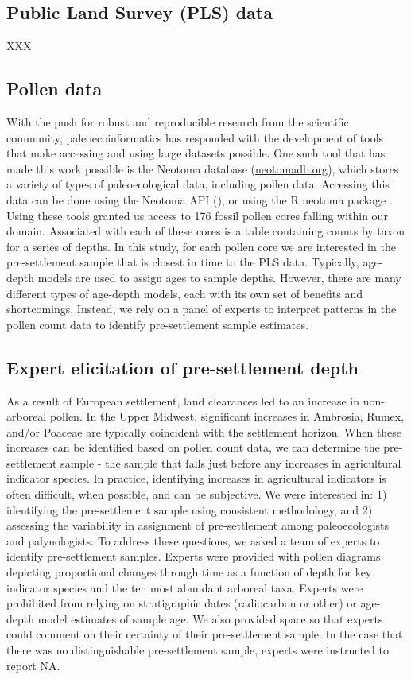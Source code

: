 \documentclass[12pt]{article}
\begin{document}
\subsection{Public Land Survey (PLS) data}
XXX

\subsection{Pollen data}
With the push for robust and reproducible research from the scientific community, paleoecoinformatics has responded with the development of tools that make accessing and using large datasets possible. One such tool that has made this work possible is the Neotoma database (\url{neotomadb.org}), which stores a variety of types of paleoecological data, including pollen data. Accessing this data can be done using the Neotoma API (), or using the R neotoma package \cite{neotoma}. Using these tools granted us access to 176 fossil pollen cores falling within our domain. Associated with each of these cores is a table containing counts by taxon for a series of depths. In this study, for each pollen core we are interested in the pre-settlement sample that is closest in time to the PLS data. Typically, age-depth models are used to assign ages to sample depths. However, there are many different types of age-depth models, each with its own set of benefits and shortcomings. Instead, we rely on a panel of experts to interpret patterns in the pollen count data to identify pre-settlement sample estimates.

\subsection{Expert elicitation of pre-settlement depth}
 As a result of European settlement, land clearances led to an increase in non-arboreal pollen. In the Upper Midwest, significant increases in Ambrosia, Rumex, and/or Poaceae are typically coincident with the settlement horizon. When these increases can be identified based on pollen count data, we can determine the pre-settlement sample - the sample that falls just before any increases in agricultural indicator species. In practice, identifying increases in agricultural indicators is often difficult, when possible, and can be subjective. We were interested in: 1) identifying the pre-settlement sample using consistent methodology, and 2) assessing the variability in assignment of pre-settlement among paleoecologists and palynologists. To address these questions, we asked a team of experts to identify pre-settlement samples. Experts were provided with pollen diagrams depicting proportional changes through time as a function of depth for key indicator species and the ten most abundant arboreal taxa. Experts were prohibited from relying on stratigraphic dates (radiocarbon or other) or age-depth model estimates of sample age. We also provided space so that experts could comment on their certainty of their pre-settlement sample. In the case that there was no distinguishable pre-settlement sample, experts were instructed to report NA.
\end{document}
